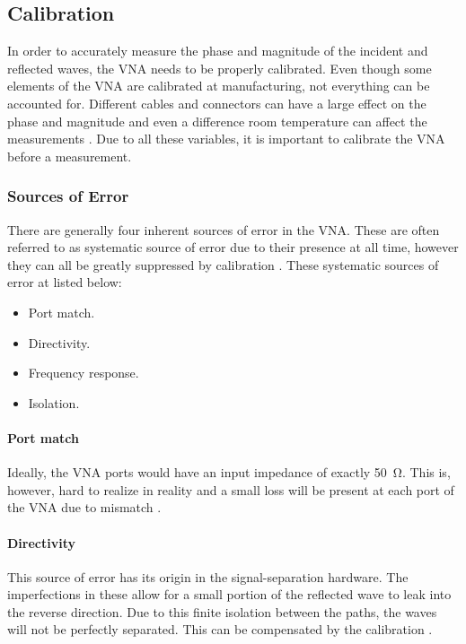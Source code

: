 \subsection{Calibration}
In order to accurately measure the phase and magnitude of the incident and reflected waves, the VNA needs to be properly calibrated. Even though some elements of the VNA are calibrated at manufacturing, not everything can be accounted for. Different cables and connectors can have a large effect on the phase and magnitude and even a difference room temperature can affect the measurements \cite{nationalInstruVNA}. Due to all these variables, it is important to calibrate the VNA before a measurement.

\subsubsection{Sources of Error}
There are generally four inherent sources of error in the VNA. These are often referred to as systematic source of error due to their presence at all time, however they can all be greatly suppressed by calibration \cite{nationalInstruVNA}. These systematic sources of error at listed below: 
\begin{itemize}
\item Port match.
\item Directivity.
\item Frequency response.
\item Isolation.
\end{itemize}

\paragraph{Port match} Ideally, the VNA ports would have an input impedance of exactly \SI{50}{\ohm}. This is, however, hard to realize in reality and a small loss will be present at each port of the VNA due to mismatch \cite{nationalInstruVNA}.

\paragraph{Directivity} This source of error has its origin in the signal-separation hardware. The imperfections in these allow for a small portion of the reflected wave to leak into the reverse direction. Due to this finite isolation between the paths, the waves will not be perfectly separated. This can be compensated by the calibration \cite{nationalInstruVNA}. 

